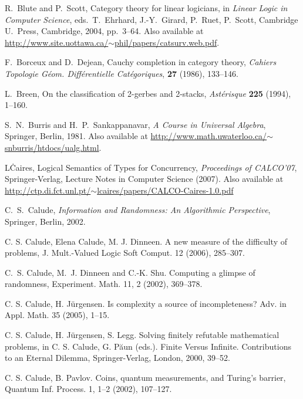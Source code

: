 \documentclass[12pt,twoside,openright]{report}
\begin{document}
\begin{thebibliography}{99}
 R.\ Blute and P.\ Scott, Category theory for linear logicians, in {\sl Linear Logic in Computer Science}, eds.\
T.\ Ehrhard, J.-Y.\ Girard, P.\ Ruet, P.\ Scott, Cambridge U.\ Press, Cambridge, 2004, pp.\ 3--64.  Also available at 
\href{http://www.site.uottawa.ca/~phil/papers/catsurv.web.pdf}
{http://www.site.uottawa.ca/$\sim$phil/papers/catsurv.web.pdf}.

 F.\ Borceux and D.\ Dejean, Cauchy completion in category theory, \textsl{Cahiers Topologie G\'eom. Diff\'erentielle Cat\'egoriques}, \textbf{27} (1986), 133--146.

 L.\ Breen, On the classification of 2-gerbes and 2-stacks, \textsl{Ast\'erisque} \textbf{225} (1994), 1--160.

 S.\ N.\ Burris and H.\ P.\ Sankappanavar,
{\sl A Course in Universal Algebra}, Springer, Berlin, 1981.  Also available at \href{http://www.math.uwaterloo.ca/~snburris/htdocs/ualg.html}
{http://www.math.uwaterloo.ca/$\sim$snburris/htdocs/ualg.html}.

 L\. Caires, Logical Semantics of Types for Concurrency, \textsl{Proceedings of CALCO'07}, Springer-Verlag, Lecture Notes in Computer Science (2007).  Also available at \href{http://ctp.di.fct.unl.pt/~lcaires/papers/CALCO-Caires-1.0.pdf}{http://ctp.di.fct.unl.pt/$\sim$lcaires/papers/CALCO-Caires-1.0.pdf}

 C.\ S.\ Calude, {\sl Information and Randomness: 
An Algorithmic Perspective}, Springer, Berlin, 2002.

C. S. Calude, Elena Calude, M. J. Dinneen. A new measure of the difficulty  of  problems,  J. Mult.-Valued Logic Soft Comput. 12 (2006), 285--307.

 C.~S. Calude, M.~J. Dinneen and C.-K. Shu. Computing a glimpse of randomness,  Experiment. Math. 11, 2 (2002), 369--378. 
 
 
 C. S. Calude, H. J{\"u}rgensen.  Is complexity a source of incompleteness? Adv.  in Appl. Math. 35 (2005), 1--15.

 C. S. Calude, H. J\"{u}rgensen, S. Legg. Solving finitely refutable mathematical problems, in C. S. Calude, G. P\u{a}un (eds.).  Finite Versus Infinite.  Contributions to an Eternal Dilemma, Springer-Verlag, London, 2000, 39--52.

 C.  S. Calude, B. Pavlov. Coins, quantum measurements, and Turing's barrier,  Quantum Inf. Process. 1, 1--2 (2002), 107--127.


\end{thebibliography}
\end{document}
